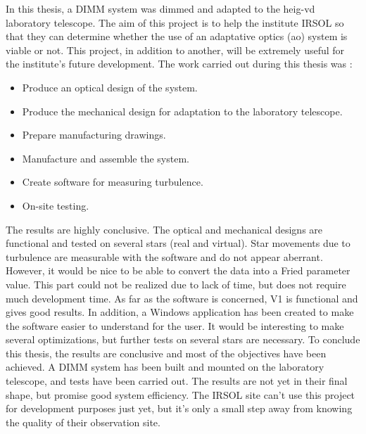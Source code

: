In this thesis, a \Gls{DIMM} system was dimmed and adapted to the \Gls{heig-vd} laboratory telescope.
The aim of this project is to help the institute \Gls{IRSOL} so that they can determine whether the use of
an adaptative optics (\Gls{ao}) system is viable or not. This project, in addition to another,
will be extremely useful for the institute's future development.
\bigbreak
The work carried out during this thesis was :
\begin{itemize}
    \item Produce an optical design of the system.
    \item Produce the mechanical design for adaptation to the laboratory telescope.
    \item Prepare manufacturing drawings.
    \item Manufacture and assemble the system.
    \item Create software for measuring turbulence.
    \item On-site testing.
\end{itemize}
\bigbreak
The results are highly conclusive. \newline
The optical and mechanical designs are functional and tested on several stars (real and virtual). \newline
Star movements due to turbulence are measurable with the software and do not appear aberrant.
However, it would be nice to be able to convert the data into a Fried parameter value.
This part could not be realized due to lack of time, but does not require much development time.
\newline
As far as the software is concerned, V1 is functional and gives good results.
In addition, a Windows application has been created to make the software easier to understand for the user.
It would be interesting to make several optimizations, but further tests on several stars are necessary.
\bigbreak
To conclude this thesis, the results are conclusive and most of the objectives have been achieved.
A \Gls{DIMM} system has been built and mounted on the laboratory telescope, and tests have been carried out.
The results are not yet in their final shape, but promise good system efficiency.
The \Gls{IRSOL} site can't use this project for development purposes just yet, but it's only a small step away
from knowing the quality of their observation site.
\newpage
\vfil
\hspace{8cm}\makeatletter\@author\makeatother\par
\hspace{8cm}\begin{minipage}{5cm}
    \printsignature
\end{minipage}